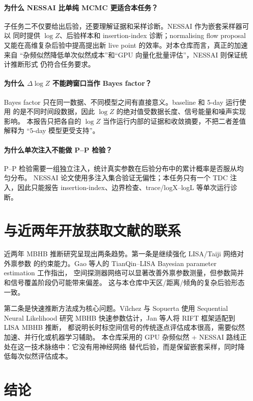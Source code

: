 \documentclass[11pt,a4paper]{ctexart}
\begin{document}
\paragraph{为什么 NESSAI 比单纯 MCMC 更适合本任务？}
子任务二不仅要给出后验，还要理解证据和采样诊断。NESSAI 作为嵌套采样器可以
同时提供 \(\log Z\)、后验样本和 insertion-index 诊断；normalising flow proposal
又能在高维复杂后验中提高提出新 live point 的效率。对本仓库而言，真正的加速来自
“杂频似然降低单次似然成本”和“GPU 向量化批量评估”，NESSAI 则保证统计推断形式
仍符合任务要求。

\paragraph{为什么 \(\Delta \log Z\) 不能跨窗口当作 Bayes factor？}
Bayes factor 只在同一数据、不同模型之间有直接意义。baseline 和 5-day 运行使用
的是不同时间段数据，因此 \(\log Z\) 的绝对值受数据长度、信号能量和噪声实现影响。
本报告只把各自的 \(\log Z\) 当作运行内部的证据和收敛摘要，不把二者差值解释为
“5-day 模型更受支持”。

\paragraph{为什么单次注入不能做 P--P 检验？}
P--P 检验需要一组独立注入，统计真实参数在后验分布中的累计概率是否服从均匀分布。
NESSAI 论文使用多注入集合验证无偏性；本任务只有一个 TDC 注入，因此只能报告
insertion-index、边界检查、trace/logX--logL 等单次运行诊断。

\section{与近两年开放获取文献的联系}

近两年 MBHB 推断研究呈现出两条趋势。第一条是继续强化 LISA/Taiji 网络对外禀参数
的约束能力。Gao 等人的 TianQin--LISA Bayesian parameter estimation 工作指出，
空间探测器网络可以显著改善外禀参数测量，但参数简并和信号覆盖阶段仍可能带来偏差。
这与本仓库中天区/距离/倾角的复杂后验形态一致。

第二条是快速推断方法成为核心问题。Vílchez 与 Sopuerta 使用 Sequential Neural
Likelihood 研究 MBHB 快速参数估计，Jan 等人将 RIFT 框架适配到 LISA MBHB 推断，
都说明长时标空间信号的传统逐点评估成本很高，需要似然加速、并行化或机器学习辅助。
本仓库采用的 GPU 杂频似然 + NESSAI 路线正处在这一技术脉络中：它没有用神经网络
替代后验，而是保留嵌套采样，同时降低每次似然评估成本。

\section{结论}
\end{document}

